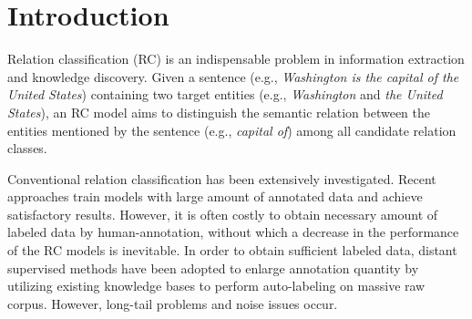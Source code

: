 \section{Introduction}
Relation classification (RC) is an indispensable problem in information extraction and knowledge discovery. Given a sentence (e.g., \emph{Washington is the capital of the United States}) containing two target entities (e.g., \emph{Washington} and \emph{the United States}), an RC model aims to distinguish the semantic relation between the entities mentioned by the sentence (e.g., \emph{capital of}) among all candidate relation classes.

Conventional relation classification has been extensively investigated. Recent approaches \cite{zeng-etal-2014-relation,RNNRC,vu-etal-2016-combining} train models with large amount of annotated data and achieve satisfactory results.
However, it is often costly to obtain necessary amount of labeled data by human-annotation,
without which a decrease in the performance of the RC models is inevitable.
In order to obtain sufficient labeled data,
distant supervised  methods \cite{NYTdataset} have been adopted to enlarge annotation quantity by utilizing existing knowledge bases to perform auto-labeling on massive raw corpus. However, long-tail problems \cite{xiong-etal-2018-one,han-etal-2018-fewrel,ye-ling-2019-multi} and noise issues occur.

